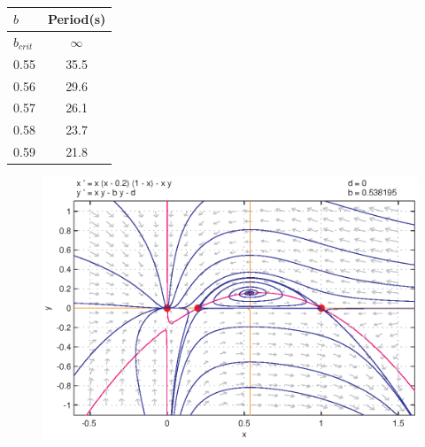 \begin{table}[H]
\begin{center}
\begin{tabular}{|l|c|}
  \hline                        
  $b$ & Period(s) \\
  \hline 
  $b_{crit}$ & $\infty$ \\
  0.55 & 35.5 \\
  0.56 & 29.6 \\
  0.57 & 26.1 \\
  0.58 & 23.7 \\
  0.59 & 21.8 \\
  \hline  
\end{tabular}
\end{center}
\caption{}
\label{tbl:orbitperiod}
\end{table}
\begin{figure}[htp]
\centering
\includegraphics{img/ex3/PPLANEhomoclinic.eps}
\caption{}
\label{fig:PPLANEhomoclinic}
\end{figure}

